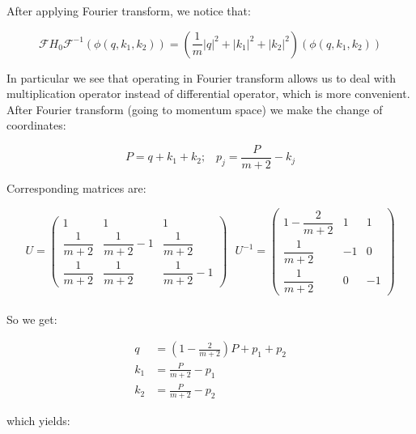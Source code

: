 \documentclass[11pt, a4paper, german]{article}
\theoremstyle{plain}
\theoremstyle{definition}
\theoremstyle{remark}
\numberwithin{equation}{section}
\numberwithin{theorem}{section}
\begin{document}
After applying Fourier transform, we notice that:

\begin{equation}
\mathcal{F} H _{0} \mathcal{F} ^{-1} \left( \phi \left( q, k _{1} , k _{2} \right) \right) = \left( \frac{1}{m} \left| q \right| ^{2} + \left| k _{1} \right| ^{2} + \left| k _{2} \right| ^{2} \right) \left( \phi \left( q, k _{1} , k _{2} \right) \right)
\end{equation}

In particular we see that operating in Fourier transform allows us to deal with multiplication operator instead of differential operator, which is more convenient.\\

After Fourier transform (going to momentum space) we make the change of coordinates:

\begin{equation}
P = q+k _{1} + k _{2}; \,\,\,\,\, p _{j} = \frac{P }{m+2} - k _{j}
\end{equation}

Corresponding matrices are:

\begin{equation}
U = \left( \begin{matrix} 1 & 1 & 1 \\[10pt] \dfrac{1}{m+2} & \dfrac{1}{m+2} -1 & \dfrac{1}{m+2} \\[10pt] \dfrac{1}{m+2} & \dfrac{1}{m+2} & \dfrac{1}{m+2} -1 \end{matrix} \right) \,\,\,\, U ^{-1} = \left( \begin{array}{ccc} 1 - \dfrac{2}{m+2} & 1 & 1 \\[10pt] \dfrac{1}{m+2} & -1 & 0 \\[10pt] \dfrac{1}{m+2} & 0 & -1 \end{array} \right) 
\end{equation}\\

So we get:

\begin{align}
q      &= \left(1 - \frac{2}{m+2} \right) P + p _{1} + p _{2} \\
k _{1} &= \frac{P}{m+2} - p _{1} \\
k _{2} &= \frac{P}{m+2} - p _{2}
\end{align}

which yields:
\end{document}
